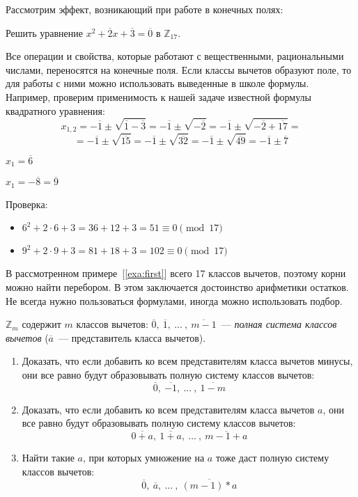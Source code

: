 \documentclass[russian]{lecture-notes}
\newcommand{\klas}[1]{\overline{#1}}
\begin{document}
Рассмотрим эффект, возникающий при работе в конечных полях:
\begin{example}
	Решить уравнение
	$x^2+\klas{2}x+\klas{3}=\klas{0}$ в $\mathbb{Z}_{17}$. 
	
	Все операции и свойства, которые работают с вещественными, рациональными числами, переносятся на конечные поля. Если классы вычетов образуют поле, то для работы с ними можно использовать выведенные в школе формулы. Например, проверим применимость к нашей задаче известной формулы квадратного уравнения:
	\[ x_{1,2} = -\klas{1} \pm \sqrt{\klas{1}-\klas{3}} = -\klas{1} \pm \sqrt{-\klas{2}} = -\klas{1} \pm \sqrt{-\klas{2}+\klas{17}} =\]
	\[ = -\klas{1} \pm \sqrt{\klas{15}} = -\klas{1} \pm \sqrt{\klas{32}} = -\klas{1} \pm \sqrt{\klas{49}} = -\klas{1} \pm \klas{7} \]
	
	$x_1 = \klas{6}$
		
	$x_1 = -\klas{8} = \klas{9}$
	
	Проверка:
	\begin{itemize}
		\item $6^2 + 2 \cdot 6 + 3 = 36 + 12 + 3 = 51 \equiv 0 \pmod{17}$
		\item $9^2 + 2 \cdot 9 + 3 = 81 + 18 + 3 = 102 \equiv 0 \pmod{17}$
	\end{itemize}
	\label{exa:first}
\end{example}

\begin{note*}
	В рассмотренном примере~[\ref{exa:first}] всего 17 классов вычетов, поэтому корни можно найти перебором. В этом заключается достоинство арифметики остатков. Не всегда нужно пользоваться формулами, иногда можно использовать подбор.
\end{note*}

\begin{note*}
	$\mathbb{Z}_m$ содержит $m$ классов вычетов: $\klas{0}, \ \klas{1}, \ \dots \ , \  \klas{m-1}$~--- \emph{полная система классов вычетов} ($\klas{a}$~--- представитель класса вычетов).
\end{note*}

\begin{problem}
	\mbox{}
	\begin{enumerate}
		\item Доказать, что если добавить ко всем представителям класса вычетов минусы, они все равно будут образовывать полную систему классов вычетов:
		\[ \klas{0}, \ \klas{-1}, \ \dots \ , \  \klas{1-m} \]
		\item Доказать, что если добавить ко всем представителям класса вычетов $a$, они все равно будут образовывать полную систему классов вычетов:
		\[ \klas{0+a}, \ \klas{1+a}, \ \dots \ , \  \klas{m-1+a} \]
		\item Найти такие $a$, при которых умножение на $a$ тоже даст полную систему классов вычетов:
		\[ \klas{0}, \ \klas{a}, \ \dots \ , \  \klas{(m-1)*a} \]
	\end{enumerate}
\end{problem}
\end{document}
